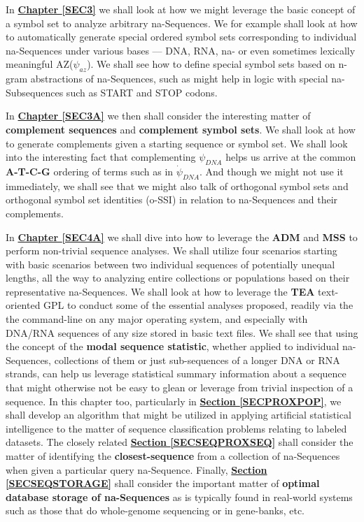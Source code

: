 \documentclass[a4paper, 18pt]{book} %
\begin{document}
In \textbf{\hyperref[SEC3]{Chapter \ref{SEC3}}} we shall look at how we might leverage the basic concept of a symbol set to analyze arbitrary na-Sequences. We for example shall look at how to automatically generate special ordered symbol sets corresponding to individual na-Sequences under various bases --- DNA, RNA, na- or even sometimes lexically meaningful AZ($\psi_{az}$). We shall see how to define special symbol sets based on n-gram abstractions of na-Sequences, such as might help in logic with special na-Subsequences such as START and STOP codons.


In \textbf{\hyperref[SEC3A]{Chapter \ref{SEC3A}}} we then shall consider the interesting matter of \textbf{complement sequences} and \textbf{complement symbol sets}. We shall look at how to generate complements given a starting sequence or symbol set. We shall look into the interesting fact that complementing $\psi_{DNA}$ helps us arrive at the common \textbf{A-T-C-G} ordering of terms such as in $\dot{\psi}_{DNA}$. And though we might not use it immediately, we shall see that we might also talk of orthogonal symbol sets and orthogonal symbol set identities (o-SSI\cite{ossipaper}) in relation to na-Sequences and their complements.

In \textbf{\hyperref[SEC4A]{Chapter \ref{SEC4A}}} we shall dive into how to leverage the \textbf{ADM} and \textbf{MSS} to perform non-trivial sequence analyses. We shall utilize four scenarios starting with basic scenarios between two individual sequences of potentially unequal lengths, all the way to analyzing entire collections or populations based on their representative na-Sequences. We shall look at how to leverage the \textbf{TEA}\cite{Lutalo2024_taz}\cite{cli_tttt} text-oriented GPL to conduct some of the essential analyses proposed, readily via the the command-line on any major operating system, and especially with DNA/RNA sequences of any size stored in basic text files. We shall see that using the concept of the \textbf{modal sequence statistic}, whether applied to individual na-Sequences, collections of them or just sub-sequences of a longer DNA or RNA strands, can help us leverage statistical summary information about a sequence that might otherwise not be easy to glean or leverage from trivial inspection of a sequence. In this chapter too, particularly in \textbf{\hyperref[SECPROXPOP]{Section \ref{SECPROXPOP}}}, we shall develop an algorithm that might be utilized in applying artificial statistical intelligence to the matter of sequence classification problems relating to labeled datasets. The closely related \textbf{\hyperref[SECSEQPROXSEQ]{Section \ref{SECSEQPROXSEQ}}} shall consider the matter of identifying the \textbf{closest-sequence} from a collection of na-Sequences when given a particular query na-Sequence. Finally, \textbf{\hyperref[SECSEQSTORAGE]{Section \ref{SECSEQSTORAGE}}} shall consider the important matter of \textbf{optimal database storage of na-Sequences} as is typically found in real-world systems such as those that do whole-genome sequencing or in gene-banks, etc. 
\end{document}
